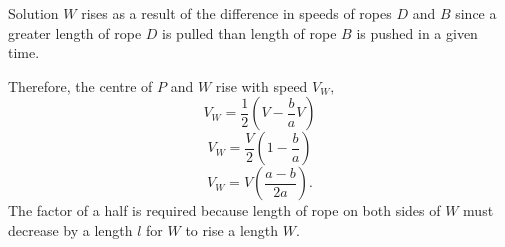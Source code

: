 \documentclass{beamer}
\begin{document}
    \begin{frame}{Solution}
        \(W\) rises as a result of the difference in speeds of ropes \(D\) and \(B\) since a greater length of rope \(D\) is pulled than length of rope \(B\) is pushed in a given time. 

        Therefore, the centre of \(P\) and \(W\) rise with speed \(V_W,\)
        \[V_W = \frac{1}{2}\left( V - \frac{b}{a} V\right) \]
        \[V_W = \frac{V}{2} \left(1 - \frac{b}{a}\right) \]
        \[V_W = V \left( \frac{a-b}{2a}\right).\]\pause
        The factor of a half is required because length of rope on both sides of \(W\) must decrease by a length \(l\) for \(W\) to rise a length \(W\). 
    \end{frame}
    
\end{document}
